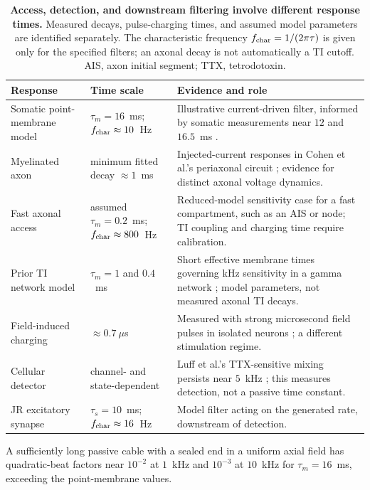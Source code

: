 \documentclass[11pt,a4paper]{article}
\begin{document}
\begin{table}[h]
\centering\small
\renewcommand{\arraystretch}{1.15}
\begin{tabular}{@{}>{\raggedright\arraybackslash}p{2.8cm}
>{\raggedright\arraybackslash}p{3.5cm}
>{\raggedright\arraybackslash}p{8.6cm}@{}}
\toprule
Response & Time scale & Evidence and role \\
\midrule
Somatic point-membrane model & $\tau_m=16$~ms; $f_{\rm char}\approx10$~Hz &
Illustrative current-driven filter, informed by somatic measurements near $12$ and $16.5$~ms
\cite{deitcher2017,eyal2016}. \\
Myelinated axon & minimum fitted decay $\approx1$~ms &
Injected-current responses in Cohen et al.'s periaxonal circuit
\cite{cohen2020periaxonal}; evidence for distinct axonal voltage dynamics. \\
Fast axonal access & assumed $\tau_m=0.2$~ms; $f_{\rm char}\approx800$~Hz &
Reduced-model sensitivity case for a fast compartment, such as an AIS or node;
TI coupling and charging time require calibration. \\
Prior TI network model & $\tau_m=1$ and $0.4$~ms &
Short effective membrane times governing kHz sensitivity in a gamma network
\cite{esmaeilpour2021}; model parameters, not measured axonal TI decays. \\
Field-induced charging & $\approx0.7~\mu$s &
Measured with strong microsecond field pulses in isolated neurons
\cite{semenov2025}; a different stimulation regime. \\
Cellular detector & channel- and state-dependent &
Luff et al.'s TTX-sensitive mixing persists near $5$~kHz
\cite{luff2024mixer}; this measures detection, not a passive time constant. \\
JR excitatory synapse & $\tau_s=10$~ms; $f_{\rm char}\approx16$~Hz &
Model filter acting on the generated rate, downstream of detection. \\
\bottomrule
\end{tabular}
\caption{\textbf{Access, detection, and downstream filtering involve different response
times.} Measured decays, pulse-charging times, and assumed model parameters are
identified separately. The characteristic frequency $f_{\rm char}=1/(2\pi\tau)$
is given only for the specified filters; an axonal decay is not automatically a TI
cutoff. AIS, axon initial segment; TTX, tetrodotoxin.}
\label{tab:doors}
\end{table}

A sufficiently long passive cable with a sealed end in a uniform axial field
has quadratic-beat factors near $10^{-2}$ at $1$~kHz and $10^{-3}$ at
$10$~kHz for $\tau_m=16$~ms, exceeding the point-membrane values.
\end{document}
